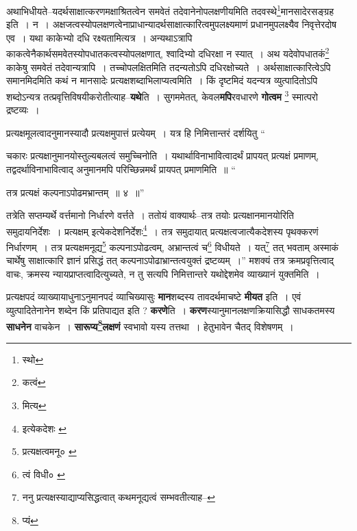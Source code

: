 \documentclass[article,12pt,a4paper]{memoir}
\begin{document}
	  \pstart अथाभिधीयते--यदर्थसाक्षात्करणमक्षाश्रितत्वेन समवेतं तदेवानेनोपलक्षणीयमिति तदवस्थे\footnote{स्थो}\-मानसादेरसङ्ग्रह इति । न । अक्षजत्वस्योपलक्षणत्वेनाप्राधान्यादर्थसाक्षात्कारित्वमुपलक्ष्यमाणं प्रधानमुपलक्ष्यैव निवृत्तेरदोष एव । यथा काकेभ्यो दधि रक्ष्यतामित्यत्र । अन्यथाऽत्रापि काकत्वेनैकार्थसमवेतस्योपधातकत्वस्योपलक्षणात्, श्वादिभ्यो दधिरक्षा न स्यात् । अथ यदेवोपधातकं\footnote{कत्वं} काकेषु समवेतं तदेवान्यत्रापि । तच्चोपलक्षितमिति तदन्यतोऽपि दधिरक्षोच्यते । अर्थसाक्षात्कारित्वेऽपि समानमिदमिति कथं न मानसादेः प्रत्यक्षशब्दाभिलाप्यत्वमिति । किं दृष्टमिदं यदन्यत्र व्युत्पादितोऽपि शब्दोऽन्यत्र तत्प्रवृत्तिविषयीकरोतीत्याह--\textbf{यथे}ति । सुगममेतत्, केवल\textbf{मपि}रवधारणे \textbf{गोत्वम} \footnote{मित्य} स्मात्परो द्रष्टव्यः ।
	\pend
      

	  \pstart प्रत्यक्षमूलत्वादनुमानस्यादौ प्रत्यक्षमुपात्तं प्रत्येयम् । यत्र हि निमित्तान्तरं दर्शयितु  \leavevmode{} “
	  
	चकारः प्रत्यक्षानुमानयोस्तुल्यबलत्वं समुच्चिनोति । यथार्थाविनाभावित्वादर्थं प्रापयत् प्रत्यक्षं प्रमाणम्, तद्वदर्थाविनाभावित्वाद् अनुमानमपि परिच्छिन्नमर्थं प्रायपत् प्रमाणमिति ॥ “
	  
	तत्र प्रत्यक्षं कल्पनाऽपोढमभ्रान्तम् ॥ ४ ॥” 
	  
	तत्रेति सप्तम्यर्थे वर्त्तमानो निर्धारणे वर्त्तते । ततोयं वाक्यार्थः--तत्र तयोः प्रत्यक्षानमानयोरिति समुदायनिर्देशः । प्रत्यक्षम् इत्येकदेशनिर्देशः\footnote{इत्येकदेशः \cite{dp-msA} \cite{dp-msC} \cite{dp-edP} \cite{dp-edE} \cite{dp-edH}} । तत्र समुदायात् प्रत्यक्षत्वजात्यैकदेशस्य पृथक्करणं निर्धारणम् । तत्र प्रत्यक्षमनूद्य\footnote{प्रत्यक्षत्वमनू० \cite{dp-msB} \cite{dp-msD} \cite{dp-edP} \cite{dp-edE} \cite{dp-edH} \cite{dp-edN}} कल्पनाऽपोढत्वम्, अभ्रान्तत्वं च\footnote{त्वं विधी० \cite{dp-msB}} विधीयते । यत्\footnote{ननु प्रत्यक्षस्याद्याप्यसिद्धत्वात् कथमनूद्यत्वं सम्भवतीत्याह--\cite{dp-msD-n}} तत् भवताम् अस्माकं चार्थेषु साक्षात्कारि ज्ञानं प्रसिद्धं तत् कल्पनाऽपोढाभ्रान्तत्वयुक्तं द्रष्टव्यम् ।” मशक्यं तत्र क्रमप्रवृत्तित्वाद् वाचः, क्रमस्य न्यायप्राप्तत्वादित्युच्यते, न तु सत्यपि निमित्तान्तरे यथोद्देशमेव व्याख्यानं युक्तमिति ।
	\pend
      

	  \pstart प्रत्यक्षपदं व्याख्यायाधुनाऽनुमानपदं व्याचिख्यासुः \textbf{मान}शब्दस्य तावदर्थमाचष्टे \textbf{मीयत} इति । एवं व्युत्पादितेनानेन शब्देन किं प्रतिपाद्यत इति ? \textbf{करणे}ति । \textbf{करण}स्यानुमानलक्षणक्रियासिद्धौ साधकतमस्य \textbf{साधनेन} वाचकेन । \textbf{सारूप्य\footnote{प्यं}\-लक्षणं} स्वभावो यस्य तत्तथा । हेतुभावेन चैतद् विशेषणम् ।
	\pend
      
\end{document}
